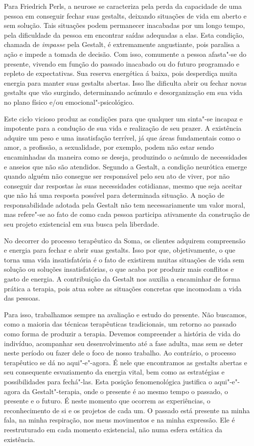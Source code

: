 Para Friedrich Perls, a neurose se caracteriza pela perda da capacidade
de uma pessoa em conseguir fechar suas gestalts, deixando situações de
vida em aberto e sem solução. Tais situações podem permanecer inacabadas
por um longo tempo, pela dificuldade da pessoa em encontrar saídas
adequadas a elas. Esta condição, chamada de \emph{impasse} pela Gestalt,
é extremamente angustiante, pois paralisa a ação e impede a tomada de
decisão. Com isso, comumente a pessoa afasta"-se do presente, vivendo em
função do passado inacabado ou do futuro programado e repleto de
expectativas. Sua reserva energética á baixa, pois desperdiça muita
energia para manter suas gestalts abertas. Isso lhe dificulta abrir ou
fechar novas gestalts que vão surgindo, determinando acúmulo e
desorganização em sua vida no plano físico e/ou emocional"-psicológico.

Este ciclo vicioso produz as condições para que qualquer um sinta"-se
incapaz e impotente para a condução de sua vida e realização de seu
prazer. A existência adquire um peso e uma insatisfação terrível, já que
áreas fundamentais como o amor, a profissão, a sexualidade, por exemplo,
podem não estar sendo encaminhadas da maneira como se deseja, produzindo
o acúmulo de necessidades e anseios que não são atendidos. Segundo a
Gestalt, a condição neurótica emerge quando alguém não consegue ser
responsável pelo seu ato de viver, por não conseguir dar respostas às
suas necessidades cotidianas, mesmo que seja aceitar que não há uma
resposta possível para determinada situação. A noção de responsabilidade
adotada pela Gestalt não tem necessariamente um valor moral, mas
refere"-se ao fato de como cada pessoa participa ativamente da construção
de seu projeto existencial em sua busca pela liberdade.

No decorrer do processo terapêutico da Soma, os clientes adquirem
compreensão e energia para fechar e abrir suas gestalts. Isso por que,
objetivamente, o que torna uma vida insatisfatória é o fato de existirem
muitas situações de vida sem solução ou soluções insatisfatórias, o que
acaba por produzir mais conflitos e gasto de energia. A contribuição da
Gestalt nos auxilia a encaminhar de forma prática a terapia, pois atua
sobre as situações concretas que incomodam a vida das pessoas.

Para isso, trabalhamos sempre na avaliação e estudo do presente. Não
buscamos, como a maioria das técnicas terapêuticas tradicionais, um
retorno ao passado como forma de produzir a terapia. Devemos compreender
a história de vida do indivíduo, acompanhar seu desenvolvimento até a
fase adulta, mas sem se deter neste período ou fazer dele o foco de
nosso trabalho. Ao contrário, o processo terapêutico se dá no
aqui"-e"-agora. É nele que encontramos as gestalts abertas e seu
consequente esvaziamento da energia vital, bem como as estratégias e
possibilidades para fechá"-las. Esta posição fenomenológica justifica o
aqui"-e"-agora da Gestalt"-terapia, onde o presente é ao mesmo tempo o
passado, o presente e o futuro. É neste momento que ocorrem as
experiências, o reconhecimento de si e os projetos de cada um. O passado
está presente na minha fala, na minha respiração, nos meus movimentos e
na minha expressão. Ele é reestruturado em cada momento existencial, não
numa esfera estática da existência.

